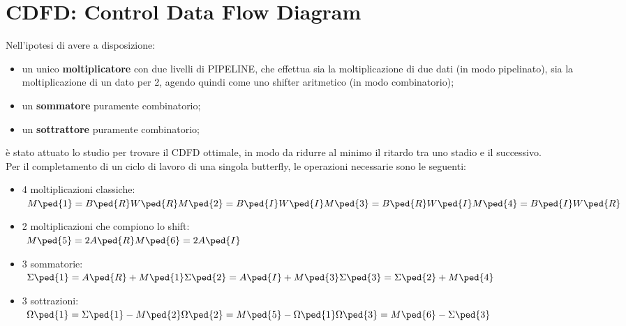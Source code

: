 \documentclass[a4paper, titlepage]{article}
\begin{document}
\section{CDFD: Control Data Flow Diagram} %
Nell'ipotesi di avere a disposizione:
\begin{itemize}
\item un unico \textbf{moltiplicatore}  con due livelli di PIPELINE, che effettua sia la moltiplicazione di due dati (in modo pipelinato), sia la moltiplicazione di un dato per 2, agendo quindi come uno shifter aritmetico (in modo combinatorio);
\item un \textbf{sommatore} puramente combinatorio;
\item un \textbf{sottrattore} puramente combinatorio;
\end{itemize}
è stato attuato lo studio per trovare il CDFD ottimale,
in modo da ridurre al minimo il ritardo tra uno stadio e il successivo.
\\Per il completamento di un ciclo di lavoro di una singola butterfly, le operazioni necessarie sono le seguenti:  %
\begin{itemize}
    \item 4 moltiplicazioni classiche:\\
    $\ M\ped{1}=B\ped{R}W\ped{R}\\
       M\ped{2}=B\ped{I}W\ped{I}\\
       M\ped{3}=B\ped{R}W\ped{I}\\
       M\ped{4}=B\ped{I}W\ped{R} $
    \item 2 moltiplicazioni che compiono lo shift:\\
    $\ M\ped{5}=2A\ped{R}\\
       M\ped{6}=2A\ped{I} $ 
    \item 3 sommatorie:\\
    $\ \Sigma\ped{1}=A\ped{R}+M\ped{1}\\
       \Sigma\ped{2}=A\ped{I}+M\ped{3}\\
       \Sigma\ped{3}=\Sigma\ped{2}+M\ped{4} $
    \item 3 sottrazioni:\\
    $\ \Omega\ped{1}=\Sigma\ped{1}-M\ped{2}\\
       \Omega\ped{2}=M\ped{5}-\Omega\ped{1}\\
       \Omega\ped{3}=M\ped{6}-\Sigma\ped{3} $
\end{itemize}
\end{document}
